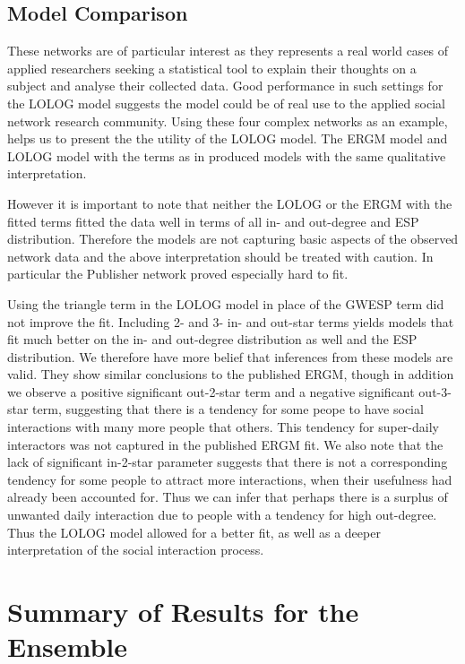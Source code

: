 \documentclass[
]{statsoc}
\begin{document}
\subsection{Model Comparison}

These networks are of particular interest as they represents a real
world cases of applied researchers seeking a statistical tool to explain
their thoughts on a subject and analyse their collected data. Good
performance in such settings for the LOLOG model suggests the model
could be of real use to the applied social network research community.
Using these four complex networks as an example, helps us to present the
the utility of the LOLOG model. The ERGM model and LOLOG model with the
terms as in \cite{Sailer2012} produced models with the same qualitative
interpretation.

However it is important to note that neither the LOLOG or the ERGM with
the fitted terms fitted the data well in terms of all in- and out-degree
and ESP distribution. Therefore the models are not capturing basic
aspects of the observed network data and the above interpretation should
be treated with caution. In particular the Publisher network proved
especially hard to fit.

Using the triangle term in the LOLOG model in place of the GWESP term
did not improve the fit. Including 2- and 3- in- and out-star terms
yields models that fit much better on the in- and out-degree
distribution as well and the ESP distribution. We therefore have more
belief that inferences from these models are valid. They show similar
conclusions to the published ERGM, though in addition we observe a
positive significant out-2-star term and a negative significant
out-3-star term, suggesting that there is a tendency for some peope to
have social interactions with many more people that others. This
tendency for super-daily interactors was not captured in the published
ERGM fit. We also note that the lack of significant in-2-star parameter
suggests that there is not a corresponding tendency for some people to
attract more interactions, when their usefulness had already been
accounted for. Thus we can infer that perhaps there is a surplus of
unwanted daily interaction due to people with a tendency for high
out-degree. Thus the LOLOG model allowed for a better fit, as well as a
deeper interpretation of the social interaction process.

\section{Summary of Results for the Ensemble}\label{sec:results}
\end{document}
